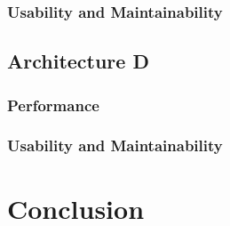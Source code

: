 \documentclass{article}
\begin{document}
\subsubsection{Usability and Maintainability}

\subsection{Architecture D}
\subsubsection{Performance}

\subsubsection{Usability and Maintainability}

\section{Conclusion}
\end{document}
